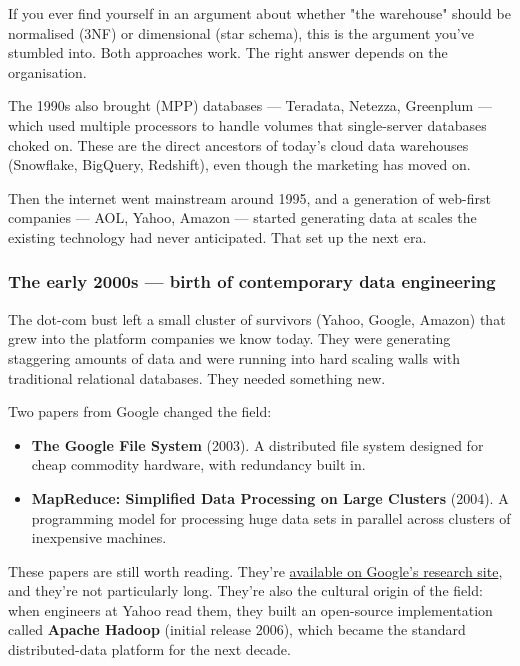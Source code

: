 If you ever find yourself in an argument about whether "the warehouse" should be normalised (3NF) or dimensional (star schema), this is the argument you've stumbled into. Both approaches work. The right answer depends on the organisation.

The 1990s also brought  (MPP) databases — Teradata, Netezza, Greenplum — which used multiple processors to handle volumes that single-server databases choked on. These are the direct ancestors of today's cloud data warehouses (Snowflake, BigQuery, Redshift), even though the marketing has moved on.

Then the internet went mainstream around 1995, and a generation of web-first companies — AOL, Yahoo, Amazon — started generating data at scales the existing technology had never anticipated. That set up the next era.

\subsubsection{The early 2000s — birth of contemporary data engineering}

The dot-com bust left a small cluster of survivors (Yahoo, Google, Amazon) that grew into the platform companies we know today. They were generating staggering amounts of data and were running into hard scaling walls with traditional relational databases. They needed something new.

Two papers from Google changed the field:

\begin{itemize}[leftmargin=*]
  \item \textbf{The Google File System} (2003). A distributed file system designed for cheap commodity hardware, with redundancy built in.
  \item \textbf{MapReduce: Simplified Data Processing on Large Clusters} (2004). A programming model for processing huge data sets in parallel across clusters of inexpensive machines.
\end{itemize}

These papers are still worth reading. They're \href{https://research.google/pubs/the-google-file-system/}{available on Google's research site}, and they're not particularly long. They're also the cultural origin of the field: when engineers at Yahoo read them, they built an open-source implementation called \textbf{Apache Hadoop} (initial release 2006), which became the standard distributed-data platform for the next decade.

